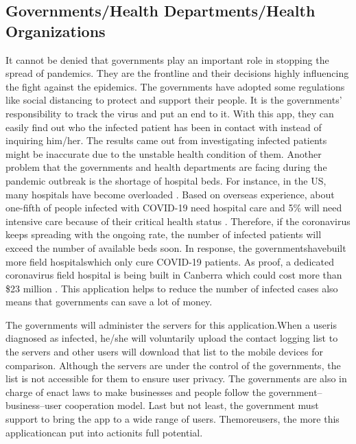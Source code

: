   \subsection{Governments/Health Departments/Health Organizations}
    \par It cannot be denied that governments play an important role in stopping the spread of pandemics. They are the frontline and their decisions highly influencing the fight against the epidemics. The governments have adopted some regulations like social  distancing  to  protect  and  support  their  people.    It  is  the  governments’ responsibility to track the virus and put an end to it. With this app, they can easily find  out  who  the  infected  patient  has  been  in  contact  with  instead  of  inquiring him/her.  The  results  came  out  from  investigating  infected  patients  might  be inaccurate due to the unstable health condition of them. Another  problem that the governments and health departments are facing during the pandemic outbreak is the shortage  of  hospital  beds.  For  instance,  in  the  US,  many  hospitals  have  become overloaded \cite{Stake6}.  Based  on  overseas  experience,  about  one-fifth  of  people  infected with COVID-19 need hospital care and 5\% will need intensive care because of their critical  health  status \cite{Stake3}.  Therefore,  if  the  coronavirus  keeps  spreading  with  the ongoing rate, the number of infected patients will exceed the number of available beds soon. In response, the governmentshavebuilt more field hospitalswhich only cure COVID-19 patients. As proof, a dedicated coronavirus field hospital is being built in Canberra which could cost more than \$23 million \cite{Stake7}. This application helps to reduce the number of infected cases also means that governments can save a lot of money.

    \par The governments will administer the servers for this application.When a useris diagnosed as infected, he/she will voluntarily upload the contact logging list to the servers and other users will download that list to the mobile devices for comparison. Although  the  servers  are  under  the  control  of  the  governments,  the  list  is  not accessible for them to ensure user privacy. The governments are also in charge of enact laws to make businesses and people follow the government–business–user cooperation model. Last but not least, the government must support to bring the app  to a wide range of users. Themoreusers, the more this applicationcan put into actionits full potential.

